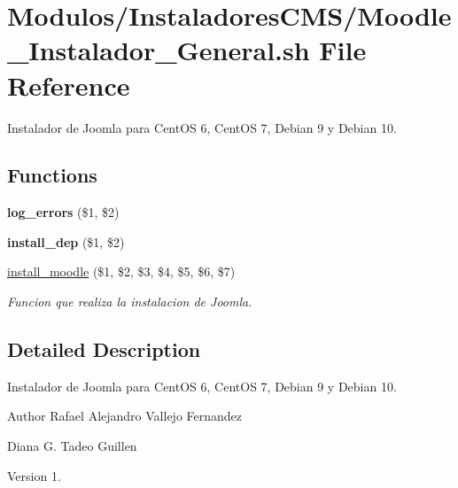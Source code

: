 \hypertarget{Moodle__Instalador__General_8sh}{}\section{Modulos/\+Instaladores\+C\+M\+S/\+Moodle\+\_\+\+Instalador\+\_\+\+General.sh File Reference}
\label{Moodle__Instalador__General_8sh}


Instalador de Joomla para Cent\+OS 6, Cent\+OS 7, Debian 9 y Debian 10.  


\subsection*{Functions}
\begin{DoxyCompactItemize}
\item 
\mbox{\label{Moodle__Instalador__General_8sh_a92067b58a8478c9841b2cd9b75ea3565}} 
{\bfseries log\+\_\+errors} (\$1, \$2)
\item 
\mbox{\label{Moodle__Instalador__General_8sh_a7aff02becf631a8cd3f06f1fc2688670}} 
{\bfseries install\+\_\+dep} (\$1, \$2)
\item 
\hyperlink{Moodle__Instalador__General_8sh_ae4c090c13511e5adcc7243e0a861bec0}{install\+\_\+moodle} (\$1, \$2, \$3, \$4, \$5, \$6, \$7)
\begin{DoxyCompactList}\small\item\em Funcion que realiza la instalacion de Joomla. \end{DoxyCompactList}\end{DoxyCompactItemize}


\subsection{Detailed Description}
Instalador de Joomla para Cent\+OS 6, Cent\+OS 7, Debian 9 y Debian 10. 

\begin{DoxyAuthor}{Author}
Rafael Alejandro Vallejo Fernandez 

Diana G. Tadeo Guillen 
\end{DoxyAuthor}
\begin{DoxyVersion}{Version}
1. 
\end{DoxyVersion}


